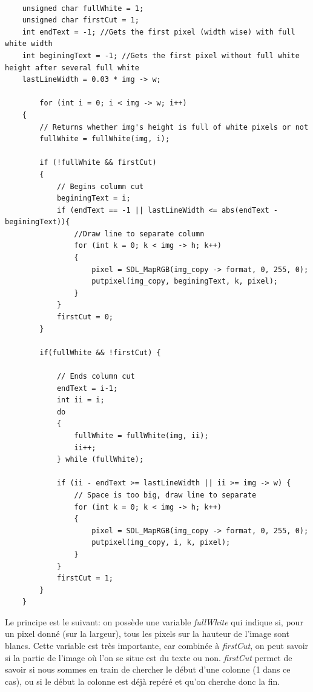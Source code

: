 \documentclass{article}
\begin{document}
    \begin{lstlisting}
    
    unsigned char fullWhite = 1;
    unsigned char firstCut = 1;
    int endText = -1; //Gets the first pixel (width wise) with full white width
    int beginingText = -1; //Gets the first pixel without full white height after several full white 
    lastLineWidth = 0.03 * img -> w;
    
		for (int i = 0; i < img -> w; i++) 
    {
        // Returns whether img's height is full of white pixels or not
        fullWhite = fullWhite(img, i);

        if (!fullWhite && firstCut)
        {   
            // Begins column cut
            beginingText = i;
            if (endText == -1 || lastLineWidth <= abs(endText - beginingText)){
                //Draw line to separate column
                for (int k = 0; k < img -> h; k++)
                {
                    pixel = SDL_MapRGB(img_copy -> format, 0, 255, 0);
                    putpixel(img_copy, beginingText, k, pixel);
                }   
            }
            firstCut = 0;
        }
        
        if(fullWhite && !firstCut) {
        
            // Ends column cut
            endText = i-1;
            int ii = i;
            do
            {
                fullWhite = fullWhite(img, ii);
                ii++;
            } while (fullWhite);
            
            if (ii - endText >= lastLineWidth || ii >= img -> w) {
                // Space is too big, draw line to separate
                for (int k = 0; k < img -> h; k++)
                {
                    pixel = SDL_MapRGB(img_copy -> format, 0, 255, 0);
                    putpixel(img_copy, i, k, pixel);
                }
            }
            firstCut = 1;
        }
    }	
	\end{lstlisting}
	
	\par
	Le principe est le suivant: on possède une variable \textit{fullWhite} qui indique si, pour un pixel donné (sur la largeur), tous les pixels sur la hauteur de l'image sont blancs. Cette variable est très importante, car combinée à \textit{firstCut}, on peut savoir si la partie de l'image où l'on se situe est du texte ou non. \textit{firstCut} permet de savoir si nous sommes en train de chercher le début d'une colonne (1 dans ce cas), ou si le début la colonne est déjà repéré et qu'on cherche donc la fin.
	
\end{document}
